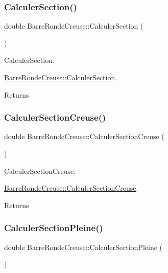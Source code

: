 \subsubsection{\texorpdfstring{Calculer\+Section()}{CalculerSection()}}
{\footnotesize\ttfamily double Barre\+Ronde\+Creuse\+::\+Calculer\+Section (\begin{DoxyParamCaption}{ }\end{DoxyParamCaption})}



Calculer\+Section. 

\hyperlink{class_barre_ronde_creuse_a46d24510057ea316c23c170d12afbd93}{Barre\+Ronde\+Creuse\+::\+Calculer\+Section}.

\begin{DoxyReturn}{Returns}

\end{DoxyReturn}
\mbox{\label{class_barre_ronde_creuse_af9402b2d372be8fef565f76d26050ba9}} 
\subsubsection{\texorpdfstring{Calculer\+Section\+Creuse()}{CalculerSectionCreuse()}}
{\footnotesize\ttfamily double Barre\+Ronde\+Creuse\+::\+Calculer\+Section\+Creuse (\begin{DoxyParamCaption}{ }\end{DoxyParamCaption})}



Calculer\+Section\+Creuse. 

\hyperlink{class_barre_ronde_creuse_af9402b2d372be8fef565f76d26050ba9}{Barre\+Ronde\+Creuse\+::\+Calculer\+Section\+Creuse}.

\begin{DoxyReturn}{Returns}

\end{DoxyReturn}
\mbox{\label{class_barre_ronde_creuse_a4e5242dcbb3599a116b2a46855f7bc67}} 
\subsubsection{\texorpdfstring{Calculer\+Section\+Pleine()}{CalculerSectionPleine()}}
{\footnotesize\ttfamily double Barre\+Ronde\+Creuse\+::\+Calculer\+Section\+Pleine (\begin{DoxyParamCaption}{ }\end{DoxyParamCaption})}



